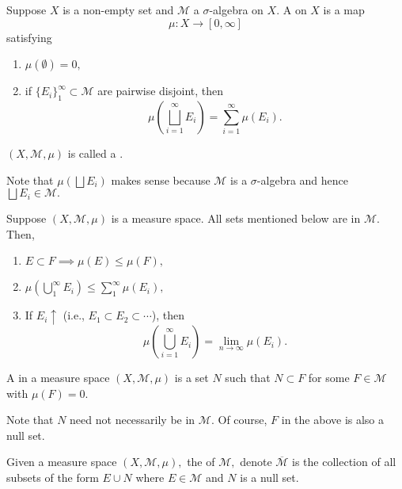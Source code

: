 \documentclass[12pt]{article}	%
\begin{document}
\begin{defn}[Measure]
	Suppose $X$ is a non-empty set and $\mathcal{M}$ a $\sigma$-algebra on $X.$ A  on $X$ is a map 
	\begin{equation*} 
		\mu : X \to [0, \infty]
	\end{equation*}
	satisfying
	\begin{enumerate}
		\item $\mu(\emptyset) = 0,$
		\item if $\{E_i\}_{1}^\infty \subset \mathcal{M}$ are pairwise disjoint, then
		\begin{equation*} 
			\mu\left(\bigsqcup_{i = 1}^\infty E_i\right) = \sum_{i = 1}^{\infty} \mu(E_i).
		\end{equation*}
	\end{enumerate}
	$(X, \mathcal{M}, \mu)$ is called a .
\end{defn}
Note that $\mu\left(\bigsqcup E_i\right)$ makes sense because $\mathcal{M}$ is a $\sigma$-algebra and hence $\bigsqcup E_i \in \mathcal{M}.$

\begin{prop}
	Suppose $(X, \mathcal{M}, \mu)$ is a measure space. All sets mentioned below are in $\mathcal{M}.$ Then,
	\begin{enumerate}
		\item $E \subset F \implies \mu(E) \le \mu(F),$
		\item $\mu\left(\bigcup_{1}^\infty E_i\right) \le \sum_{1}^{\infty} \mu(E_i),$
		\item If $E_i \uparrow$ (i.e., $E_1 \subset E_2 \subset \cdots$), then
		\begin{equation*} 
			\mu\left(\bigcup_{i = 1}^\infty E_i\right) = \lim_{n\to \infty} \mu(E_i).
		\end{equation*}
	\end{enumerate}
\end{prop}

\begin{defn}
	A  in a measure space $(X, \mathcal{M}, \mu)$ is a set $N$ such that $N \subset F$ for some $F \in \mathcal{M}$ with $\mu(F) = 0.$
\end{defn}
Note that $N$ need not necessarily be in $\mathcal{M}.$ Of course, $F$ in the above is also a null set.

\begin{defn}[Completion]
	Given a measure space $(X, \mathcal{M}, \mu),$ the  of $\mathcal{M},$ denote $\overline{\mathcal{M}}$ is the collection of all subsets of the form $E \cup N$ where $E \in \mathcal{M}$ and $N$ is a null set. 
\end{defn}
\end{document}
